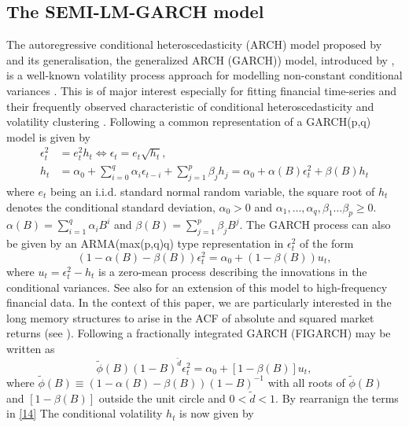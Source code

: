 \documentclass[12pt]{article}
\begin{document}
\subsection{The SEMI-LM-GARCH model}
The autoregressive conditional heteroscedasticity (ARCH) model proposed by \citet{engle1982autoregressive} and its generalisation, the generalized ARCH (GARCH)) model, introduced by \citet{bollerslev1986generalized} , is a well-known volatility process approach for modelling non-constant conditional variances . This is of major interest especially for  fitting financial time-series and their frequently observed characteristic of conditional heteroscedasticity and volatility clustering \citep{mandelbrot1963new}. Following  \citet{baillie1996fractionally} a common representation of a GARCH(p,q) model is given by
\begin{align}
	\epsilon_t^2&=e^2_th_t\iff\epsilon_t=e_t\sqrt{h_t}, \\
	h_t&=\alpha_0+\sum_{i=0}^{q}\alpha_i\epsilon_{t-i}+\sum_{j=1}^{p}\beta_jh_j=\alpha_0+\alpha(B)\epsilon_t^2+\beta(B)h_t
\end{align}
where $e_t$ being an i.i.d. standard normal random variable, the square root of $h_t$ denotes the conditional standard deviation, $\alpha_0>0$ and $\alpha_1,\dots,\alpha_q,\beta_1\dots\beta_p\geq0$. $\alpha(B)=\sum_{i=1}^{q}\alpha_iB^i$ and $\beta(B)=\sum_{j=1}^{p}\beta_jB^j$. The GARCH process can also be given by an ARMA(max(p,q)q) type representation in $\epsilon_t^2$ of the form
\begin{equation}
\label{10}
(1-\alpha(B)-\beta(B))\epsilon^2_t=\alpha_0+(1-\beta(B))u_t,	
\end{equation}
where $u_t=\epsilon^2_t-h_t$ is a zero-mean process describing the innovations in the conditional variances. See also \citet{feng2008modelling} for an extension of this model to high-frequency financial data. In the context of this paper, we are particularly interested in the long memory structures to arise in the ACF of absolute and squared market returns (see \cite{ding1993long}). Following \citet{baillie1996fractionally} a fractionally integrated GARCH (FIGARCH) may be written as
\begin{equation}
\label{14}
\tilde{\phi}(B)(1-B)^{\tilde{d}}\epsilon_t^2=\alpha_0+[1-\beta(B)]u_t,
\end{equation}
where $\tilde{\phi}(B)\equiv (1-\alpha(B)-\beta(B))(1-B)^{-1}$ with all roots of $\tilde{\phi}(B)$ and $[1-\beta(B)]$ outside the unit circle and $0<\tilde{d}<1$. By rearranign the terms in \eqref{14} The conditional volatility $h_t$ is now given by
\end{document}
